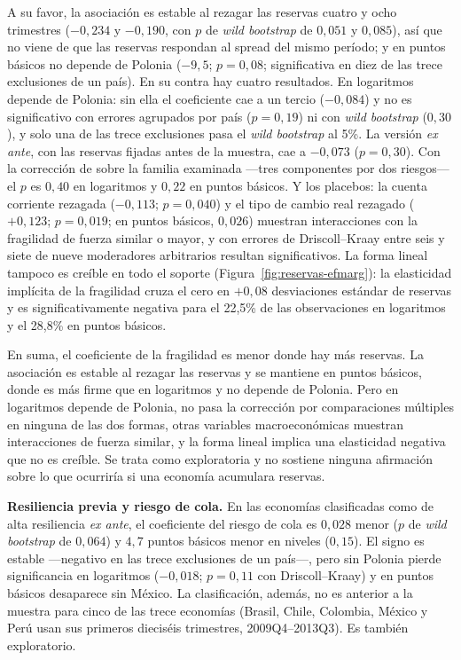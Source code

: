 A su favor, la asociación es estable al rezagar las reservas cuatro y ocho trimestres ($-0{,}234$ y $-0{,}190$, con $p$ de \textit{wild bootstrap} de $0{,}051$ y $0{,}085$), así que no viene de que las reservas respondan al spread del mismo período; y en puntos básicos no depende de Polonia ($-9{,}5$; $p=0{,}08$; significativa en diez de las trece exclusiones de un país). En su contra hay cuatro resultados. En logaritmos depende de Polonia: sin ella el coeficiente cae a un tercio ($-0{,}084$) y no es significativo con errores agrupados por país ($p=0{,}19$) ni con \textit{wild bootstrap} ($0{,}30$), y solo una de las trece exclusiones pasa el \textit{wild bootstrap} al 5\%. La versión \textit{ex ante}, con las reservas fijadas antes de la muestra, cae a $-0{,}073$ ($p=0{,}30$). Con la corrección de \citet{Holm1979} sobre la familia examinada ---tres componentes por dos riesgos--- el $p$ es $0{,}40$ en logaritmos y $0{,}22$ en puntos básicos. Y los placebos: la cuenta corriente rezagada ($-0{,}113$; $p=0{,}040$) y el tipo de cambio real rezagado ($+0{,}123$; $p=0{,}019$; en puntos básicos, $0{,}026$) muestran interacciones con la fragilidad de fuerza similar o mayor, y con errores de Driscoll--Kraay entre seis y siete de nueve moderadores arbitrarios resultan significativos. La forma lineal tampoco es creíble en todo el soporte (Figura~\ref{fig:reservas-efmarg}): la elasticidad implícita de la fragilidad cruza el cero en $+0{,}08$ desviaciones estándar de reservas y es significativamente negativa para el 22,5\% de las observaciones en logaritmos y el 28,8\% en puntos básicos.


En suma, el coeficiente de la fragilidad es menor donde hay más reservas. La asociación es estable al rezagar las reservas y se mantiene en puntos básicos, donde es más firme que en logaritmos y no depende de Polonia. Pero en logaritmos depende de Polonia, no pasa la corrección por comparaciones múltiples en ninguna de las dos formas, otras variables macroeconómicas muestran interacciones de fuerza similar, y la forma lineal implica una elasticidad negativa que no es creíble. Se trata como exploratoria y no sostiene ninguna afirmación sobre lo que ocurriría si una economía acumulara reservas.

\textbf{Resiliencia previa y riesgo de cola.} En las economías clasificadas como de alta resiliencia \textit{ex ante}, el coeficiente del riesgo de cola es $0{,}028$ menor ($p$ de \textit{wild bootstrap} de $0{,}064$) y $4{,}7$ puntos básicos menor en niveles ($0{,}15$). El signo es estable ---negativo en las trece exclusiones de un país---, pero sin Polonia pierde significancia en logaritmos ($-0{,}018$; $p=0{,}11$ con Driscoll--Kraay) y en puntos básicos desaparece sin México. La clasificación, además, no es anterior a la muestra para cinco de las trece economías (Brasil, Chile, Colombia, México y Perú usan sus primeros dieciséis trimestres, 2009Q4--2013Q3). Es también exploratorio.

